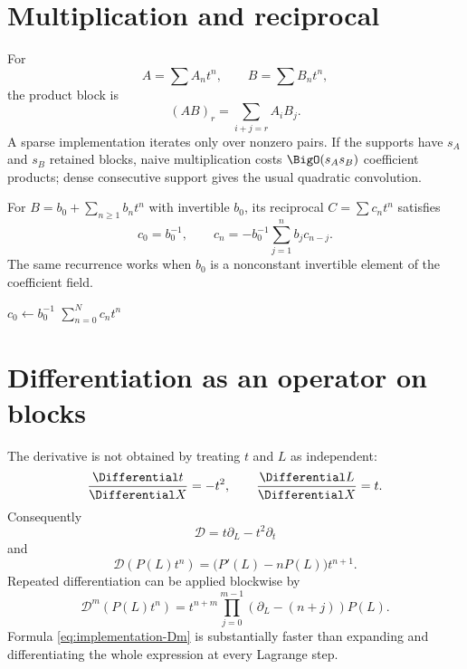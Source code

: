 \documentclass[11pt,oneside]{book}
\theoremstyle{definition}
\theoremstyle{remark}
\newcommand{\D}{\mathcal D}
\newcommand{\trunc}[2]{\left[#1\right]_{\le #2}}
\begin{document}
\section{Multiplication and reciprocal}
For
\[
 A=\sum A_nt^n,\qquad B=\sum B_nt^n,
\]
the product block is
\[
 (AB)_r=\sum_{i+j=r}A_iB_j.
\]
A sparse implementation iterates only over nonzero pairs. If the supports
have $s_A$ and $s_B$ retained blocks, naive multiplication costs
$\BigO(s_As_B)$ coefficient products; dense consecutive support gives the
usual quadratic convolution.

For $B=b_0+\sum_{n\ge1}b_nt^n$ with invertible $b_0$, its reciprocal
$C=\sum c_nt^n$ satisfies
\begin{equation}\label{eq:implementation-reciprocal}
 c_0=b_0^{-1},\qquad
 c_n=-b_0^{-1}\sum_{j=1}^{n}b_jc_{n-j}.
\end{equation}
The same recurrence works when $b_0$ is a nonconstant invertible element of
the coefficient field.

\begin{algorithm}[H]
\caption{Truncated reciprocal}
\KwOut{$C=\trunc{B^{-1}}{N}$}
$c_0\leftarrow b_0^{-1}$\;
\Return $\sum_{n=0}^{N}c_nt^n$\;
\end{algorithm}

\section{Differentiation as an operator on blocks}
The derivative is not obtained by treating $t$ and $L$ as independent:
\[
 \frac{\Differential t}{\Differential X}=-t^2,\qquad
 \frac{\Differential L}{\Differential X}=t.
\]
Consequently
\begin{equation}\label{eq:implementation-D}
 \D=t\partial_L-t^2\partial_t
\end{equation}
and
\begin{equation}\label{eq:implementation-D-block}
 \D\!\left(P(L)t^n\right)
 =\bigl(P'(L)-nP(L)\bigr)t^{n+1}.
\end{equation}
Repeated differentiation can be applied blockwise by
\begin{equation}\label{eq:implementation-Dm}
 \D^m\!\left(P(L)t^n\right)
 =t^{n+m}
 \prod_{j=0}^{m-1}
 \left(\partial_L-(n+j)\right)P(L).
\end{equation}
Formula \eqref{eq:implementation-Dm} is substantially faster than expanding
and differentiating the whole expression at every Lagrange step.
\end{document}
